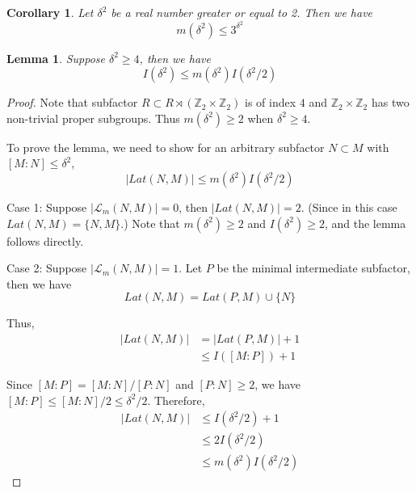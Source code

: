 \documentclass[11pt,letterpaper]{amsart}
\newtheorem{corollary}[theorem]{Corollary}
\newtheorem{lemma}[theorem]{Lemma}
\theoremstyle{definition}
\theoremstyle{remark}
\begin{document}
\begin{corollary}\label{cor:minimal}
	Let $\delta^2$ be a real number greater or equal to 2. Then we have 
	\begin{equation*}
	m(\delta^2)\leq 3^{\delta^2}
	\end{equation*}
\end{corollary}

\begin{lemma}\label{lem: mIinequ}
	Suppose $\delta^2\geq 4$, then we have 
	\begin{equation*}
	I(\delta^2)\leq m(\delta^2)I(\delta^2/2)
	\end{equation*}
\end{lemma}
\begin{proof}
	Note that subfactor $R\subset R\rtimes(\mathbb{Z}_2\times\mathbb{Z}_2)$ is of index $4$ and $\mathbb{Z}_2\times\mathbb{Z}_2$ has two non-trivial proper subgroups. Thus $m(\delta^2)\geq 2$ when $\delta^2\geq4$. 
	
	To prove the lemma, we need to show for an arbitrary subfactor $N\subset M$ with $[M:N]\leq\delta^2$, 
	\begin{equation*}
	\vert Lat(N,M) \vert\leq m(\delta^2)I(\delta^2/2)
	\end{equation*}
	
	Case 1: Suppose $\vert \mathcal{L}_m(N,M)\vert=0$, then $\vert Lat(N,M)\vert =2$. (Since in this case $Lat(N,M)=\{N,M\}$.) Note that $m(\delta^2)\geq2$ and $I(\delta^2)\geq2$, and the lemma follows directly.
	\bigskip
	
	
	Case 2: Suppose $\vert \mathcal{L}_m(N,M)\vert=1$. Let $P$ be the minimal intermediate subfactor, then we have
	\begin{equation*}
	Lat(N,M)=Lat(P,M)\cup\{N\}
	\end{equation*}
	
	Thus, \begin{align*}
	\vert Lat(N,M)\vert& =\vert Lat(P,M)\vert+1\\
	&\leq I([M:P])+1
	\end{align*}
	
    Since $[M:P]=[M:N]/[P:N]$ and $[P:N]\geq2$, we have $[M:P]\leq[M:N]/2\leq \delta^2/2$. Therefore,
    \begin{align*}
    \vert Lat(N,M)\vert&\leq I(\delta^2/2)+1\\
    &\leq 2I(\delta^2/2)\\
    &\leq m(\delta^2)I(\delta^2/2)    
    \end{align*}
    

\end{proof}
\end{document}

